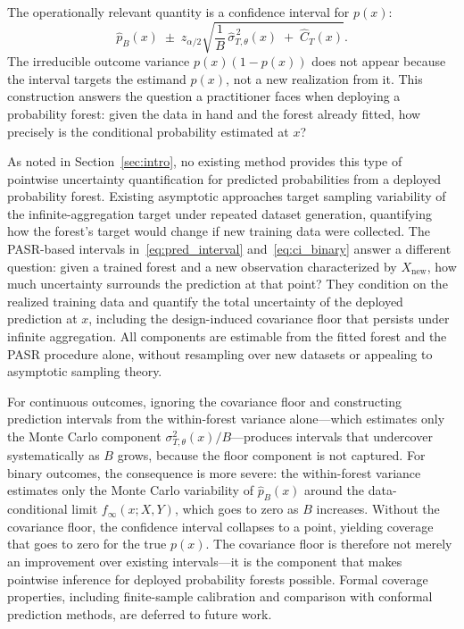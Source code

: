\documentclass[11pt]{article}
\theoremstyle{plain}
\theoremstyle{definition}
\theoremstyle{remark}
\begin{document}
The operationally relevant quantity is a confidence interval for $p(x)$:
\begin{equation}
	\label{eq:ci_binary}
	\hat p_B(x)
	\;\pm\;
	z_{\alpha/2}
	\sqrt{
		\frac{1}{B}\,\widehat\sigma_{T,\theta}^{\,2}(x)
		\;+\;
		\widehat C_T(x)
	}.
\end{equation}
The irreducible outcome variance $p(x)(1-p(x))$ does not appear because the interval targets the estimand $p(x)$, not a new realization from it. This construction answers the question a practitioner faces when deploying a probability forest: given the data in hand and the forest already fitted, how precisely is the conditional probability estimated at $x$?

As noted in Section~\ref{sec:intro}, no existing method provides this type of pointwise uncertainty quantification for predicted probabilities from a deployed probability forest. Existing asymptotic approaches target sampling variability of the infinite-aggregation target under repeated dataset generation, quantifying how the forest's target would change if new training data were collected. The PASR-based intervals in~\eqref{eq:pred_interval} and~\eqref{eq:ci_binary} answer a different question: given a trained forest and a new observation characterized by $X_{\mathrm{new}}$, how much uncertainty surrounds the prediction at that point? They condition on the realized training data and quantify the total uncertainty of the deployed prediction at $x$, including the design-induced covariance floor that persists under infinite aggregation. All components are estimable from the fitted forest and the PASR procedure alone, without resampling over new datasets or appealing to asymptotic sampling theory.

For continuous outcomes, ignoring the covariance floor and constructing prediction intervals from the within-forest variance alone---which estimates only the Monte Carlo component $\sigma_{T,\theta}^2(x)/B$---produces intervals that undercover systematically as $B$ grows, because the floor component is not captured. For binary outcomes, the consequence is more severe: the within-forest variance estimates only the Monte Carlo variability of $\hat{p}_B(x)$ around the data-conditional limit $f_\infty(x;X,Y)$, which goes to zero as $B$ increases. Without the covariance floor, the confidence interval collapses to a point, yielding coverage that goes to zero for the true $p(x)$. The covariance floor is therefore not merely an improvement over existing intervals---it is the component that makes pointwise inference for deployed probability forests possible. Formal coverage properties, including finite-sample calibration and comparison with conformal prediction methods, are deferred to future work.
\end{document}
